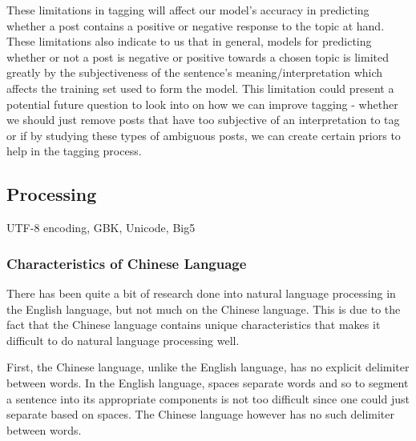 \documentclass[11pt]{article}
\newcommand{\1}[1]{{\mathbf 1}\left\{#1\right\}}        %
\begin{document}
These limitations in tagging will affect our model's accuracy in predicting whether a post contains a positive or negative response to the topic at hand.  These limitations also indicate to us that in general, models for predicting whether or not a post is negative or positive towards a chosen topic is limited greatly by the subjectiveness of the sentence's meaning/interpretation which affects the training set used to form the model. This limitation could present a potential future question to look into on how we can improve tagging - whether we should just remove posts that have too subjective of an interpretation to tag or if by studying these types of ambiguous posts, we can create certain priors to help in the tagging process. 

\subsection{Processing}



UTF-8 encoding, GBK, Unicode, Big5

\subsubsection{Characteristics of Chinese Language}\label{subsec:Chinese}





There has been quite a bit of research done into natural language processing in the English language, but not much on the Chinese language.  This is due to the fact that the Chinese language contains unique characteristics that makes it difficult to do natural language processing well. 
 
First, the Chinese language, unlike the English language, has no explicit delimiter between words. In the English language, spaces separate words and so to segment a sentence into its appropriate components is not too difficult since one could just separate based on spaces.  The Chinese language however has no such delimiter between words.
 
\end{document}
